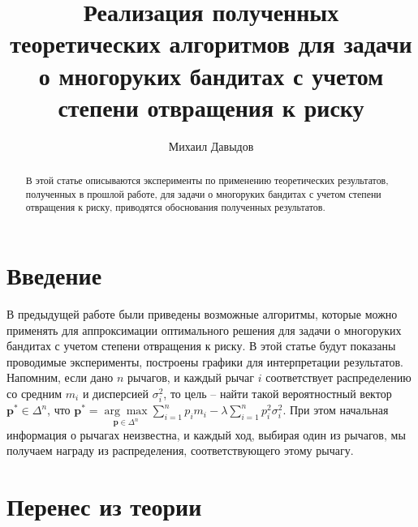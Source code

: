 \documentclass{article}
\title{Реализация полученных теоретических алгоритмов для задачи о многоруких бандитах с учетом степени отвращения к риску}
\author{Михаил Давыдов}
\begin{document}
\maketitle

\begin{abstract}
В этой статье описываются эксперименты по применению теоретических результатов, полученных в прошлой работе, для задачи о многоруких бандитах с учетом степени отвращения к риску, приводятся обоснования полученных результатов.
\end{abstract}

\section{Введение}

В предыдущей работе были приведены возможные алгоритмы, которые можно применять для аппроксимации оптимального решения для задачи о многоруких бандитах с учетом степени отвращения к риску. В этой статье будут показаны проводимые эксперименты, построены графики для интерпретации результатов. Напомним, если дано $n$ рычагов, и каждый рычаг $i$ соответствует распределению со средним $m_i$ и дисперсией $\sigma_i^2$, то цель -- найти такой вероятностный вектор $\textbf{p}^* \in \Delta^n$, что $\textbf{p}^* = \underset{\textbf{p} \in \Delta^n}{\arg \max} \sum_{i=1}^n p_i m_i - \lambda \sum_{i=1}^n p_i^2 \sigma_i^2$. При этом начальная информация о рычагах неизвестна, и каждый ход, выбирая один из рычагов, мы получаем награду из распределения, соответствующего этому рычагу.

\section{Перенес из теории}
\end{document}
